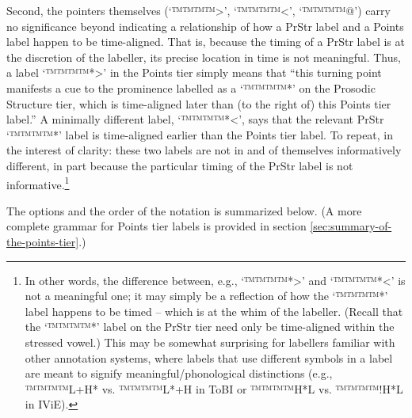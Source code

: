\documentclass[11pt, twoside]{memoir}
\begin{document}
Second, the pointers themselves (‘™™™™{>}’, ‘™™™™{<}’, ‘™™™™{@}’) carry no significance beyond indicating a relationship of how a PrStr label and a Points label happen to be time-aligned. That is, because the timing of a PrStr label is at the discretion of the labeller, its precise location in time is not meaningful.  Thus, a label ‘™™™™{*>}’ in the Points tier simply means that “this turning point manifests a cue to the prominence labelled as a ‘™™™™{*}’ on the Prosodic Structure tier, which is time-aligned later than (to the right of) this Points tier label.” A minimally different label, ‘™™™™{*<}’, says that the relevant PrStr ‘™™™™{*}’ label is time-aligned earlier than the Points tier label. To repeat, in the interest of clarity: these two labels are not in and of themselves informatively different, in part because the particular timing of the PrStr label is not informative.\footnote{In other words, the difference between, e.g., ‘™™™™{*>}’ and ‘™™™™{*<}’ is not a meaningful one; it may simply be a reflection of how the ‘™™™™{*}’ label happens to be timed – which is at the whim of the labeller. (Recall that the ‘™™™™{*}’ label on the PrStr tier need only be time-aligned within the stressed vowel.) This may be somewhat surprising for labellers familiar with other annotation systems, where labels that use different symbols in a label are meant to signify meaningful\slash phonological distinctions (e.g., ™™™™{L+H*} vs. ™™™™{L*+H} in ToBI or ™™™™{H*L} vs. ™™™™{!H*L} in IViE).}

The options and the order of the notation is summarized below. (A more complete grammar for Points tier labels is provided in section \ref{sec:summary-of-the-points-tier}.)
\end{document}
